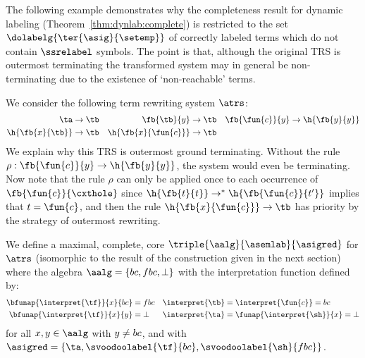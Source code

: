 The following example demonstrates why the completeness result for dynamic labeling (Theorem~\ref{thm:dynlab:complete}) 
is restricted to the set $\dolabelg{\ter{\asig}{\setemp}}$ of correctly labeled terms 
which do not contain $\ssrelabel$ symbols.
The point is that, although the original TRS is outermost terminating
the transformed system may in general be non-terminating 
due to the existence of `non-reachable' terms.
\begin{example}\label{ex:dynlab:noncomplete}
  We consider the following term rewriting system $\atrs$:
  \begin{align*}
    \ta &\to \tb
    &
    \fb{\tb}{y} &\to \tb
    &
    \fb{\fun{c}}{y} &\to \h{\fb{y}{y}} 
    \\
    \h{\fb{x}{\tb}} &\to \tb
    &  
    \h{\fb{x}{\fun{c}}} &\to \tb
  \end{align*}
  We explain why this TRS is outermost ground terminating.
  Without the rule $\rho : \fb{\fun{c}}{y} \to \h{\fb{y}{y}}$, 
  the system would even be terminating.
  Now note that the rule $\rho$ can only be applied once 
  to each occurrence of $\fb{\fun{c}}{\cxthole}$
  since $\h{\fb{t}{t}} \to^* \h{\fb{\fun{c}}{t'}}$ implies that $t = \fun{c}$,
  and then the rule $\h{\fb{x}{\fun{c}}} \to \tb$ has priority by the strategy of outermost rewriting.

  We define a maximal, complete, core \clabeling{} 
  $\triple{\aalg}{\asemlab}{\asigred}$ for $\atrs$
  (isomorphic to the result of the construction given in the next section) where the algebra $\aalg = \{ \mit{bc}, \mit{fbc}, \bot \}$ 
  with the interpretation function defined by:
  \begin{align*}
  \bfunap{\interpret{\tf}}{x}{\mit{bc}} &= \mit{fbc}
  &  
  \interpret{\tb} & = \interpret{\fun{c}} = \mit{bc}
  \\
  \bfunap{\interpret{\tf}}{x}{y} &= \bot
  &
  \interpret{\ta} & = \funap{\interpret{\sh}}{x} = \bot 
  \end{align*}
  for all $x,y \in \aalg$ with $y \ne \mit{bc}$,
  and with $\asigred = \{ \ta , \svoodoolabel{\tf}{\mit{bc}} , \svoodoolabel{\sh}{\mit{fbc}} \}$.



\end{example}

